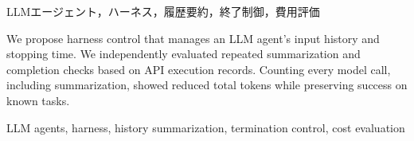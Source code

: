 \begin{abstract}
LLMエージェントの入力履歴と終了時点を管理するハーネス制御を提案する．履歴の反復要約とAPI実行記録に基づく完了判定を独立に評価した．要約生成を含む全モデル呼出しを計測し，既知課題の成功を保ちながら\mbox{総トークン数を削減できることを示した．}
\end{abstract}
\begin{keyword}
LLMエージェント，ハーネス，履歴要約，終了制御，費用評価
\end{keyword}
\begin{eabstract}
We propose harness control that manages an LLM agent's input history and stopping time. We independently evaluated repeated summarization and completion checks based on API execution records. Counting every model call, including summarization, showed reduced total tokens while preserving success on known tasks.
\end{eabstract}
\begin{ekeyword}
LLM agents, harness, history summarization, termination control, cost evaluation
\end{ekeyword}
